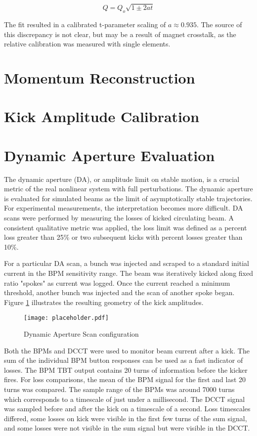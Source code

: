 \begin{equation}
    Q = Q_o \sqrt{1\pm 2at}
    \label{eq:fitTune}
\end{equation}

The fit resulted in a calibrated t-parameter scaling of $a \approx 0.935$. The source of this discrepancy is not clear, but may be a result of magnet crosstalk, as the relative calibration was measured with single elements.

\section{Momentum Reconstruction} \label{sec:momReconst}

\section{Kick Amplitude Calibration} \label{sec:kickAmpCal}

\section{Dynamic Aperture Evaluation} \label{sec:daEval}
The dynamic aperture (DA), or amplitude limit on stable motion, is a crucial metric of the real nonlinear system with full perturbations. The dynamic aperture is evaluated for simulated beams as the limit of asymptotically stable trajectories. For experimental measurements, the interpretation becomes more difficult. DA scans were performed by measuring the losses of kicked circulating beam. A consistent qualitative metric was applied, the loss limit was defined as a percent loss greater than 25\% or two subsequent kicks with percent losses greater than 10\%.

For a particular DA scan, a bunch was injected and scraped to a standard initial current in the BPM sensitivity range. The beam was iteratively kicked along fixed ratio "spokes" as current was logged. Once the current reached a minimum threshold, another bunch was injected and the scan of another spoke began.  Figure \ref{fig:spokes} illustrates the resulting geometry of the kick amplitudes.

\begin{figure}
	\centering
	\texttt{[image: placeholder.pdf]}
	\caption{Dynamic Aperture Scan configuration}
	\label{fig:spokes}
\end{figure}

Both the BPMs and DCCT were used to monitor beam current after a kick. The sum of the individual BPM button responses can be used as a fast indicator of losses. The BPM TBT output contains 20 turns of information before the kicker fires. For loss comparisons, the mean of the BPM signal for the first and last 20 turns was compared. The sample range of the BPMs was around 7000 turns which corresponds to a timescale of just under a millisecond. The DCCT signal was sampled before and after the kick on a timescale of a second. Loss timescales differed, some losses on kick were visible in the first few turns of the sum signal, and some losses were not visible in the sum signal but were visible in the DCCT. 

